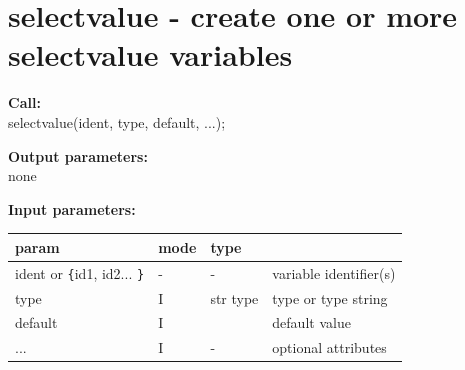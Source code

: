 %
%
%
%
% 

    \section{selectvalue - create one or more selectvalue variables}\label{sec:ipselectvalue}
        
        {\bf Call:} \\
        selectvalue(ident, type, default, ...);
        
        {\bf Output parameters:} \\
        none
        
        {\bf Input parameters:} \\
        \begin{tabular}{| l | l | l | l |}
        \hline
        param  & mode & type & \\
        \hline \hline
        ident or \verb'{'id1, id2... \verb'}' & - & - & variable identifier(s) \\ \hline
        type    & I & str type & type or type string                           \\ \hline
        default & I &          & default value                                 \\ \hline
        ...     & I &  -       & optional attributes                           \\ \hline
        \end{tabular}
        
